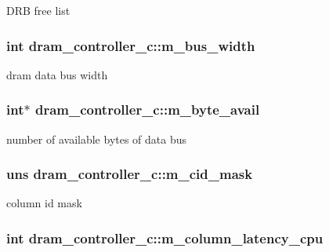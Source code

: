 \label{classdram__controller__c_a62d96cc25786a499d89ae5d17732e532}
DRB free list \hypertarget{classdram__controller__c_a88d2351690ac79425da4af48c28a55bd}{
\subsubsection[{m\_\-bus\_\-width}]{\setlength{\rightskip}{0pt plus 5cm}int {\bf dram\_\-controller\_\-c::m\_\-bus\_\-width}}}
\label{classdram__controller__c_a88d2351690ac79425da4af48c28a55bd}
dram data bus width \hypertarget{classdram__controller__c_add7d44dbb73dedd43c51a97ee1d0c17d}{
\subsubsection[{m\_\-byte\_\-avail}]{\setlength{\rightskip}{0pt plus 5cm}int$\ast$ {\bf dram\_\-controller\_\-c::m\_\-byte\_\-avail}}}
\label{classdram__controller__c_add7d44dbb73dedd43c51a97ee1d0c17d}
number of available bytes of data bus \hypertarget{classdram__controller__c_ae55d96ec26968a1343ac0de05bd6485d}{
\subsubsection[{m\_\-cid\_\-mask}]{\setlength{\rightskip}{0pt plus 5cm}uns {\bf dram\_\-controller\_\-c::m\_\-cid\_\-mask}}}
\label{classdram__controller__c_ae55d96ec26968a1343ac0de05bd6485d}
column id mask \hypertarget{classdram__controller__c_a5f58c9560276617cab02c610b01b2cb1}{
\subsubsection[{m\_\-column\_\-latency\_\-cpu}]{\setlength{\rightskip}{0pt plus 5cm}int {\bf dram\_\-controller\_\-c::m\_\-column\_\-latency\_\-cpu}}}
